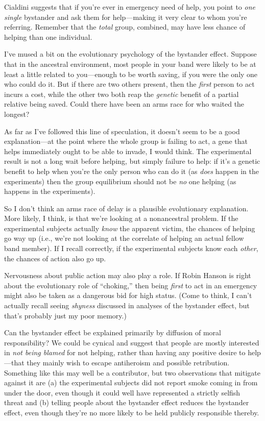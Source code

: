 {
 Cialdini suggests that if you're ever in emergency
need of help, you point to \textit{one single} bystander and ask them
for help---making it very clear to whom you're
referring. Remember that the \textit{total} group, combined, may have
less chance of helping than one individual.}

{
 I've mused a bit on the evolutionary psychology of
the bystander effect. Suppose that in the ancestral environment, most
people in your band were likely to be at least a little related to
you---enough to be worth saving, if you were the only one who could do
it. But if there are two others present, then the \textit{first} person
to act incurs a cost, while the other two both reap the
\textit{genetic} benefit of a partial relative being saved. Could there
have been an arms race for who waited the longest?}

{
 As far as I've followed this line of speculation,
it doesn't seem to be a good explanation---at the point
where the whole group is failing to act, a gene that helps immediately
ought to be able to invade, I would think. The experimental result is
not a long wait before helping, but simply failure to help: if
it's a genetic benefit to help when
you're the only person who can do it (as \textit{does}
happen in the experiments) then the group equilibrium should not be
\textit{no} one helping (as happens in the experiments).}

{
 So I don't think an arms race of delay is a
plausible evolutionary explanation. More likely, I think, is that
we're looking at a nonancestral problem. If the
experimental subjects actually \textit{know} the apparent victim, the
chances of helping go way up (i.e., we're not looking
at the correlate of helping an actual fellow band member). If I recall
correctly, if the experimental subjects know each \textit{other}, the
chances of action also go up.}

{
 Nervousness about public action may also play a role. If Robin
Hanson is right about the evolutionary role of
``choking,'' then being
\textit{first} to act in an emergency might also be taken as a
dangerous bid for high status. (Come to think, I can't
actually recall seeing \textit{shyness} discussed in analyses of the
bystander effect, but that's probably just my poor
memory.)}

{
 Can the bystander effect be explained primarily by diffusion of
moral responsibility? We could be cynical and suggest that people are
mostly interested in \textit{not being blamed} for not helping, rather
than having any positive desire to help---that they mainly wish to
escape antiheroism and possible retribution. Something like this may
well be a contributor, but two observations that mitigate against it
are (a) the experimental subjects did not report smoke coming in from
under the door, even though it could well have represented a strictly
selfish threat and (b) telling people about the bystander effect
reduces the bystander effect, even though they're no
more likely to be held publicly responsible thereby.}

